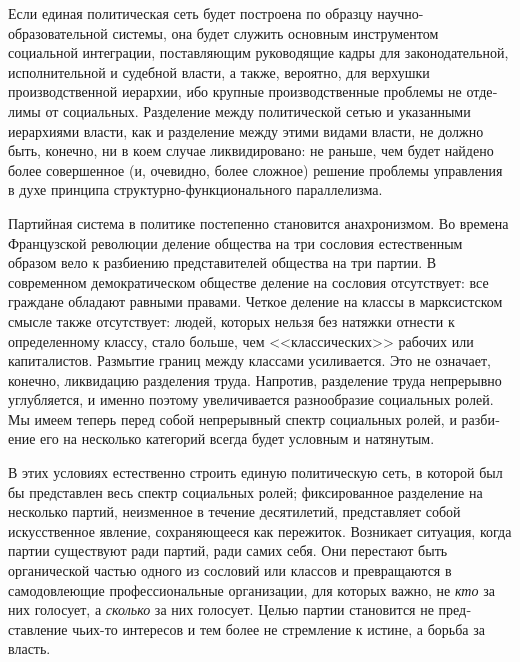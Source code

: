 \documentclass{book}
\begin{document}
Если единая политическая сеть будет построена по образцу научно-образовательной системы, она будет служить основным инструментом социальной интеграции, поставляющим руково­дящие кадры для законодательной, исполнительной и судебной власти, а также, вероятно, для верхушки производственной иерархии, ибо крупные производственные проблемы не отде­лимы от социальных. Разделение между политической сетью и указанными иерархиями власти, как и разделение между этими видами власти, не должно быть, конечно, ни в коем случае лик­видировано: не раньше, чем будет найдено более совершенное (и, очевидно, более сложное) решение проблемы управления в духе принципа структурно-функционального параллелизма.

Партийная система в политике постепенно становится ана­хронизмом. Во времена Французской революции деление об­щества на три сословия естественным образом вело к разбиению представителей общества на три партии. В современном демократическом обществе деление на сословия отсутствует: все граждане обладают равными правами. Четкое деление на классы в марксистском смысле также отсутствует: людей, которых нельзя без натяжки отнести к определенному классу, стало больше, чем <<классических>> рабочих или капиталистов. Размытие границ между классами усиливается. Это не озна­чает, конечно, ликвидацию разделения труда. Напротив, разде­ление труда непрерывно углубляется, и именно поэтому увеличивается разнообразие социальных ролей. Мы имеем теперь перед собой непрерывный спектр социальных ролей, и разби­ение его на несколько категорий всегда будет условным и на­тянутым.

В этих условиях естественно строить единую политическую сеть, в которой был бы представлен весь спектр социальных ролей; фиксированное разделение на несколько партий, неиз­менное в течение десятилетий, представляет собой искусствен­ное явление, сохраняющееся как пережиток. Возникает ситу­ация, когда партии существуют ради партий, ради самих себя. Они перестают быть органической частью одного из сословий или классов и превращаются в самодовлеющие профессиональ­ные организации, для которых важно, не \textit{кто}  за них голосует, а \textit{сколько}  за них голосует. Целью партии становится не пред­ставление чьих-то интересов и тем более не стремление к исти­не, а борьба за власть.
\end{document}

